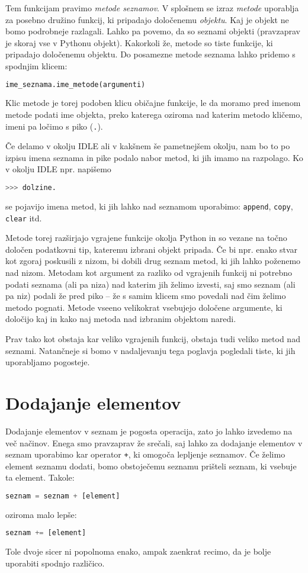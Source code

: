 Tem funkcijam pravimo \emph{metode seznamov}. V splošnem se izraz \emph{metode} uporablja za posebno družino funkcij, ki pripadajo določenemu \emph{objektu}. Kaj je objekt ne bomo podrobneje razlagali. Lahko pa povemo, da so seznami objekti (pravzaprav je skoraj vse v Pythonu objekt). Kakorkoli že, metode so tiste funkcije, ki pripadajo določenemu objektu. Do posamezne metode seznama lahko pridemo s spodnjim klicem:
\begin{lstlisting}[language=Python]
ime_seznama.ime_metode(argumenti)
\end{lstlisting}
Klic metode je torej podoben klicu običajne funkcije, le da moramo pred imenom metode podati ime objekta, preko katerega oziroma nad katerim metodo kličemo, imeni pa ločimo s piko (\texttt{.}).

Če delamo v okolju IDLE ali v kakšnem še pametnejšem okolju, nam bo to po izpisu imena seznama in pike podalo nabor metod, ki jih imamo na razpolago. Ko v okolju IDLE npr. napišemo
\begin{lstlisting}[language=Python]
>>> dolzine.
\end{lstlisting}
se pojavijo imena metod, ki jih lahko nad seznamom uporabimo: \texttt{append}, \texttt{copy}, \texttt{clear} itd.

Metode torej razširjajo vgrajene funkcije okolja Python in so vezane na točno določen podatkovni tip, kateremu izbrani objekt pripada. Če bi npr. enako stvar kot zgoraj poskusili z nizom, bi dobili drug seznam metod, ki jih lahko poženemo nad nizom. Metodam kot argument za razliko od vgrajenih funkcij ni potrebno podati seznama (ali pa niza) nad katerim jih želimo izvesti, saj smo seznam (ali pa niz) podali že pred piko -- že s samim klicem smo povedali nad čim želimo metodo pognati. Metode vseeno velikokrat vsebujejo določene argumente, ki določijo kaj in kako naj metoda nad izbranim objektom naredi. 

Prav tako kot obstaja kar veliko vgrajenih funkcij, obstaja tudi veliko metod nad seznami. Natančneje si bomo v nadaljevanju tega poglavja pogledali tiste, ki jih uporabljamo pogosteje.

\section{Dodajanje elementov}

Dodajanje elementov v seznam je pogosta operacija, zato jo lahko izvedemo na več načinov. Enega smo pravzaprav že srečali, saj lahko za dodajanje elementov v seznam uporabimo kar operator \texttt{+}, ki omogoča lepljenje seznamov. Če želimo element seznamu dodati, bomo obstoječemu seznamu prišteli seznam, ki vsebuje ta element. Takole:
\begin{lstlisting}[language=Python]
seznam = seznam + [element]
\end{lstlisting}
oziroma malo lepše:
\begin{lstlisting}[language=Python]
seznam += [element]
\end{lstlisting}
Tole dvoje sicer ni popolnoma enako, ampak zaenkrat recimo, da je bolje uporabiti spodnjo različico. 

